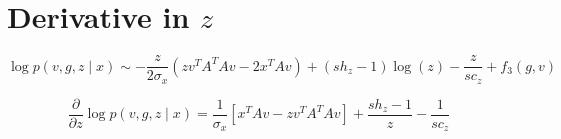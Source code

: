 \documentclass{paper}
\begin{document}
\section{Derivative in $z$}

\begin{equation}
\log p(v,g,z \mid x) \sim - \frac{z}{2 \sigma_x} \left( zv^TA^TAv - 2x^TAv \right) + (sh_z - 1) \log(z) - \frac{z}{sc_z} + f_3(g,v)
\end{equation}

\begin{equation}
\frac{\partial}{\partial z} \log p(v,g,z \mid x) =  \frac{1}{\sigma_x} \left[ x^TAv - z v^T A^TA v \right] + \frac{sh_z - 1}{z} - \frac{1}{sc_z}
\end{equation}
\end{document}
